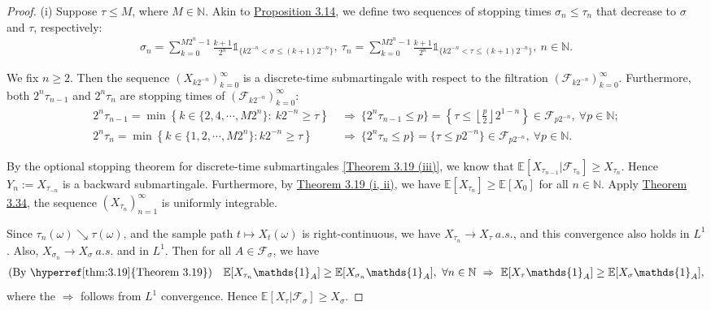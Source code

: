 \documentclass{article}
\numberwithin{equation}{section}
\newcommand{\E}{\mathbb{E}}
\theoremstyle{plain}
\theoremstyle{definition}
\begin{document}
\begin{proof}
(i) Suppose $\tau\leq M$, where $M\in\mathbb{N}$. Akin to \hyperref[prop:3.14]{Proposition 3.14}, we define two sequences of stopping times $\sigma_n\leq\tau_n$ that decrease to $\sigma$ and $\tau$, respectively:
\begin{align*}
	\sigma_n = \sum_{k=0}^{M2^n-1}\frac{k+1}{2^n}\mathds{1}_{\{k2^{-n}<\sigma\leq(k+1)2^{-n}\}},\ \tau_n = \sum_{k=0}^{M2^n-1}\frac{k+1}{2^n}\mathds{1}_{\{k2^{-n}<\tau\leq(k+1)2^{-n}\}},\ n\in\mathbb{N}.
\end{align*}

We fix $n\geq 2$. Then the sequence $(X_{k2^{-n}})_{k=0}^\infty$ is a discrete-time submartingale with respect to the filtration $(\mathscr{F}_{k2^{-n}})_{k=0}^\infty$. Furthermore, both $2^n\tau_{n-1}$ and $2^n\tau_n$ are stopping times of $(\mathscr{F}_{k2^{-n}})_{k=0}^\infty$:
\begin{align*}
	2^n\tau_{n-1}=\min\left\{k\in\{2,4,\cdots,M2^n\}:\ k2^{-n}\geq\tau\right\}\ &\Rightarrow\ \{2^n\tau_{n-1}\leq p\}=\left\{\tau\leq\left\lfloor\frac{p}{2}\right\rfloor 2^{1-n}\right\}\in\mathscr{F}_{p2^{-n}},\ \forall p\in\mathbb{N};\\
	2^n\tau_n = \min\left\{k\in\{1,2,\cdots,M2^n\}:k2^{-n}\geq\tau\right\}&\Rightarrow\ \{2^n\tau_n\leq p\}=\{\tau\leq p2^{-n}\}\in\mathscr{F}_{p2^{-n}},\ \forall p\in\mathbb{N}.
\end{align*}

By the optional stopping theorem for discrete-time submartingales \hyperref[thm:3.19]{[Theorem 3.19 (iii)]}, we know that $\E[X_{\tau_{n-1}}|\mathscr{F}_{\tau_n}]\geq X_{\tau_n}$. Hence $Y_{n}:=X_{\tau_{-n}}$ is a backward submartingale. Furthermore, by \hyperref[thm:3.19]{Theorem 3.19 (i, ii)}, we have $\E[X_{\tau_n}]\geq\E[X_0]$ for all $n\in\mathbb{N}$. Apply \hyperref[thm:3.34]{Theorem 3.34}, the sequence $(X_{\tau_n})_{n=1}^\infty$ is uniformly integrable.

Since $\tau_n(\omega)\searrow\tau(\omega)$, and the sample path $t\mapsto X_t(\omega)$ is right-continuous, we have $X_{\tau_n}\to X_\tau\ a.s.$, and this convergence also holds in $L^1$. Also, $X_{\sigma_n}\to X_\sigma\ a.s.$ and in $L^1$. Then for all $A\in\mathscr{F}_\sigma$, we have
\begin{align*}
	\text{(By \hyperref[thm:3.19]{Theorem 3.19})}\quad \E[X_{\tau_n}\mathds{1}_A]\geq\E[X_{\sigma_n}\mathds{1}_A],\ \forall n\in\mathbb{N}\ \Rightarrow\ \E[X_\tau\mathds{1}_A]\geq\E[X_\sigma\mathds{1}_A],
\end{align*}
where the $\Rightarrow$ follows from $L^1$ convergence. Hence $\E[X_\tau|\mathscr{F}_\sigma]\geq X_\sigma$.\vspace{0.1cm}


\end{proof}
\end{document}
